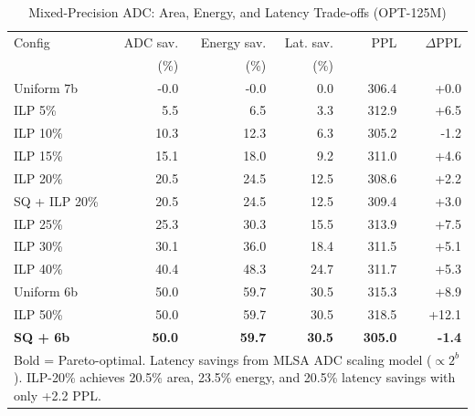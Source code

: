 \begin{table}[t]
\centering
\caption{Mixed-Precision ADC: Area, Energy, and Latency Trade-offs (OPT-125M)}
\label{tab:latency}
\begin{tabular}{lrrrrr}
\toprule
Config & ADC sav. & Energy sav. & Lat. sav. & PPL & $\Delta$PPL \\
 & (\%) & (\%) & (\%) & & \\
\midrule
Uniform 7b & -0.0 & -0.0 & 0.0 & 306.4 & +0.0 \\
ILP 5\% & 5.5 & 6.5 & 3.3 & 312.9 & +6.5 \\
ILP 10\% & 10.3 & 12.3 & 6.3 & 305.2 & -1.2 \\
ILP 15\% & 15.1 & 18.0 & 9.2 & 311.0 & +4.6 \\
ILP 20\% & 20.5 & 24.5 & 12.5 & 308.6 & +2.2 \\
SQ + ILP 20\% & 20.5 & 24.5 & 12.5 & 309.4 & +3.0 \\
ILP 25\% & 25.3 & 30.3 & 15.5 & 313.9 & +7.5 \\
ILP 30\% & 30.1 & 36.0 & 18.4 & 311.5 & +5.1 \\
ILP 40\% & 40.4 & 48.3 & 24.7 & 311.7 & +5.3 \\
Uniform 6b & 50.0 & 59.7 & 30.5 & 315.3 & +8.9 \\
ILP 50\% & 50.0 & 59.7 & 30.5 & 318.5 & +12.1 \\
\textbf{SQ + 6b} & \textbf{50.0} & \textbf{59.7} & \textbf{30.5} & \textbf{305.0} & \textbf{-1.4} \\
\bottomrule
\multicolumn{6}{p{0.85\columnwidth}}{\small Bold = Pareto-optimal. Latency savings from MLSA ADC scaling model ($\propto 2^b$). ILP-20\% achieves 20.5\% area, 23.5\% energy, and 20.5\% latency savings with only +2.2 PPL.}\\
\end{tabular}
\end{table}
